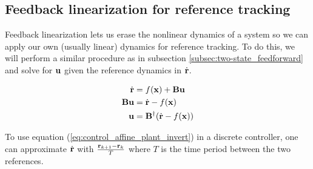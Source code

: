 \subsection{Feedback linearization for reference tracking}

Feedback linearization lets us erase the nonlinear dynamics of a system so we
can apply our own (usually linear) dynamics for \gls{reference} tracking. To do
this, we will perform a similar procedure as in subsection
\ref{subsec:two-state_feedforward} and solve for $\mathbf{u}$ given the
\gls{reference} dynamics in $\dot{\mathbf{r}}$.

\begin{align}
  \dot{\mathbf{r}} &= f(\mathbf{x}) + \mathbf{B}\mathbf{u} \nonumber \\
  \mathbf{B}\mathbf{u} &= \dot{\mathbf{r}} - f(\mathbf{x}) \nonumber \\
  \mathbf{u} &= \mathbf{B}^\dagger (\dot{\mathbf{r}} - f(\mathbf{x}))
    \label{eq:control_affine_plant_invert}
\end{align}

\begin{remark}
  To use equation (\ref{eq:control_affine_plant_invert}) in a discrete
  controller, one can approximate $\dot{\mathbf{r}}$ with
  $\frac{\mathbf{r}_{k + 1} - \mathbf{r}_k}{T}$ where $T$ is the time period between
  the two \glspl{reference}.
\end{remark}

